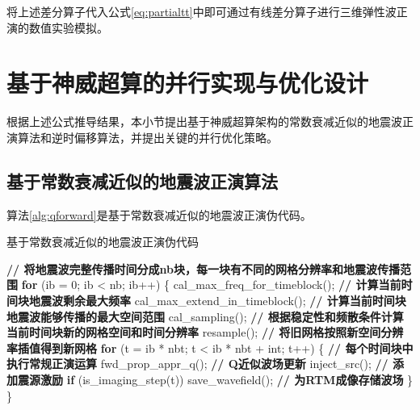 \documentclass[degree=doctor]{thuthesis}
\begin{document}
将上述差分算子代入公式\ref{eq:partialtt}中即可通过有线差分算子进行三维弹性波正演的数值实验模拟。

\section{基于神威超算的并行实现与优化设计}

根据上述公式推导结果，本小节提出基于神威超算架构的常数衰减近似的地震波正演算法和逆时偏移算法，并提出关键的并行优化策略。

\subsection{基于常数衰减近似的地震波正演算法}
算法\ref{alg:qforward}是基于常数衰减近似的地震波正演伪代码。

\begin{algorithm}[ht]
\small
\caption{基于常数衰减近似的地震波正演伪代码} \label{alg:qforward}
\begin{algorithmic}[1] 
\State \textbf{// 将地震波完整传播时间分成nb块，每一块有不同的网格分辨率和地震波传播范围}
\State \textbf{for} (ib = 0; ib < nb; ib++) \{ \label{ln:qfwdnb}
\State \quad\quad cal\_max\_freq\_for\_timeblock(); \textbf{// 计算当前时间块地震波剩余最大频率} \label{ln:calfreq}
\State \quad\quad cal\_max\_extend\_in\_timeblock(); \textbf{// 计算当前时间块地震波能够传播的最大空间范围} \label{ln:calextend}
\State \quad\quad cal\_sampling(); \textbf{// 根据稳定性和频散条件计算当前时间块新的网格空间和时间分辨率} \label{ln:calsampling}
\State \quad\quad resample(); \textbf{// 将旧网格按照新空间分辨率插值得到新网格} \label{ln:resample}
\State \quad\quad
\State \quad\quad \textbf{for} (t = ib * nbt; t < ib * nbt + int; t++) \{ \textbf{// 每个时间块中执行常规正演运算} \label{ln:tbbegin}
\State \quad\quad\quad\quad fwd\_prop\_appr\_q(); \textbf{// Q近似波场更新}   
\State \quad\quad\quad\quad inject\_src(); \textbf{// 添加震源激励}
\State \quad\quad\quad\quad \textbf{if} (is\_imaging\_step(t)) 
\State \quad\quad\quad\quad\quad\quad save\_wavefield(); \textbf{// 为RTM成像存储波场} \label{ln:savewavefield}
\State \quad\quad \} \label{ln:tbend}
\State \} \label{ln:qfwdnbend}
\end{algorithmic}
\end{algorithm}
\end{document}
